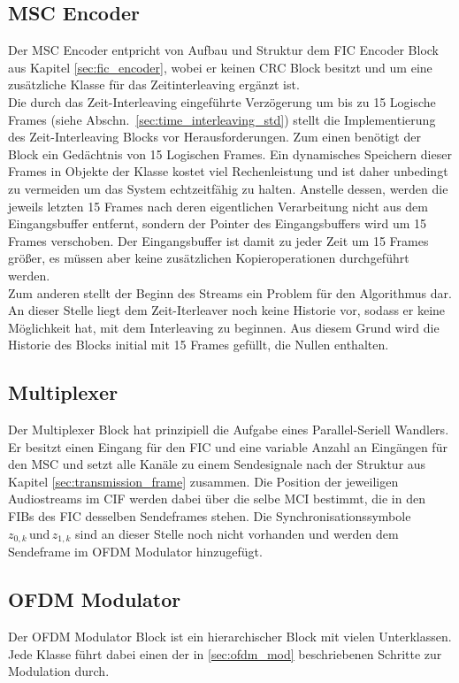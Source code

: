 \subsection{MSC Encoder}
Der MSC Encoder entpricht von Aufbau und Struktur dem FIC Encoder Block aus Kapitel \ref{sec:fic_encoder}, wobei er keinen CRC Block besitzt und um eine zusätzliche Klasse für das Zeitinterleaving ergänzt ist.\\
Die durch das Zeit-Interleaving eingeführte Verzögerung um bis zu 15 Logische Frames (siehe Abschn.~\ref{sec:time_interleaving_std}) stellt die Implementierung des Zeit-Interleaving Blocks vor Herausforderungen. Zum einen benötigt der Block ein Gedächtnis von 15 Logischen Frames. Ein dynamisches Speichern dieser Frames in Objekte der Klasse kostet viel Rechenleistung und ist daher unbedingt zu vermeiden um das System echtzeitfähig zu halten. Anstelle dessen, werden die jeweils letzten 15 Frames nach deren eigentlichen Verarbeitung nicht aus dem Eingangsbuffer entfernt, sondern der Pointer des Eingangsbuffers wird um 15 Frames verschoben. Der Eingangsbuffer ist damit zu jeder Zeit um 15 Frames größer, es müssen aber keine zusätzlichen Kopieroperationen durchgeführt werden.\\
Zum anderen stellt der Beginn des Streams ein Problem für den Algorithmus dar. An dieser Stelle liegt dem Zeit-Iterleaver noch keine Historie vor, sodass er keine Möglichkeit hat, mit dem Interleaving zu beginnen. Aus diesem Grund wird die Historie des Blocks initial mit 15 Frames gefüllt, die Nullen enthalten.

\subsection{Multiplexer}
Der Multiplexer Block hat prinzipiell die Aufgabe eines Parallel-Seriell Wandlers. Er besitzt einen Eingang für den FIC und eine variable Anzahl an Eingängen für den MSC und setzt alle Kanäle zu einem Sendesignale nach der Struktur aus Kapitel \ref{sec:transmission_frame} zusammen. Die Position der jeweiligen Audiostreams im CIF werden dabei über die selbe MCI bestimmt, die in den FIBs des FIC desselben Sendeframes stehen. Die Synchronisationssymbole $z_{0,k}\, \text{und}\, z_{1,k}$ sind an dieser Stelle noch nicht vorhanden und werden dem Sendeframe im OFDM Modulator hinzugefügt.

\subsection{OFDM Modulator}
Der OFDM Modulator Block ist ein hierarchischer Block mit vielen Unterklassen. Jede Klasse führt dabei einen der in \ref{sec:ofdm_mod} beschriebenen Schritte zur Modulation durch.

